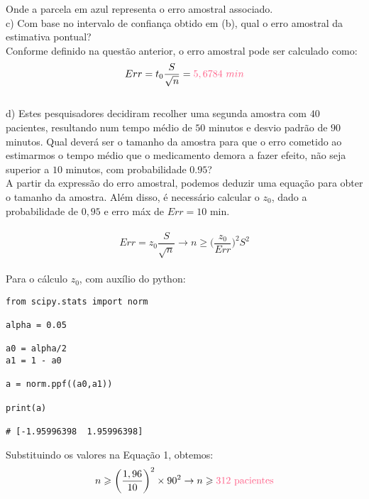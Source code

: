 Onde a parcela em \textcolor{deepblue}{azul} representa o erro amostral associado.\\

c) Com base no intervalo de confiança obtido em (b), qual o erro amostral da estimativa pontual?\\

Conforme definido na questão anterior, o erro amostral pode ser calculado como:\\

\[
    Err = t_0\frac{S}{\sqrt{n}} = \textcolor{COLOR2}{5,6784\ min}
\]
\\

d) Estes pesquisadores decidiram recolher uma segunda amostra com $40$ pacientes, resultando num tempo médio de $50$ minutos e desvio padrão de $90$ minutos. Qual deverá ser o tamanho da amostra para que o erro cometido ao estimarmos o tempo médio que o medicamento demora a fazer efeito, não seja superior a $10$ minutos, com probabilidade $0.95$?\\

A partir da expressão do erro amostral, podemos deduzir uma equação para obter o tamanho da amostra. Além disso, é necessário calcular o $z_0$, dado a probabilidade de $0,95$ e erro máx de $Err=10$ min.\\
\\

\begin{equation}
    Err = z_0\frac{S}{\sqrt{n}} \to n\geqslant \biggl(\frac{z_0}{Err}\biggr)^2 S^2
\end{equation}
\\

Para o cálculo $z_0$, com auxílio do python:\\

\begin{lstlisting}
from scipy.stats import norm
    
alpha = 0.05
            
a0 = alpha/2
a1 = 1 - a0
    
a = norm.ppf((a0,a1))
            
print(a)
    
# [-1.95996398  1.95996398]
\end{lstlisting}

Substituindo os valores na Equação 1, obtemos:\\

\[
    n\geqslant \biggl(\frac{1,96}{10}\biggr)^2\times 90^2 \to n \geqslant \textcolor{COLOR2}{312\ \text{pacientes}}
\]
\\

